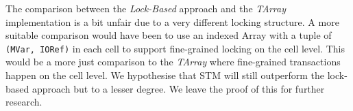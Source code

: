The comparison between the \textit{Lock-Based} approach and the \textit{TArray} implementation is a bit unfair due to a very different locking structure. A more suitable comparison would have been to use an indexed Array with a tuple of \texttt{(MVar, IORef)} in each cell to support fine-grained locking on the cell level. This would be a more just comparison to the \textit{TArray} where fine-grained transactions happen on the cell level. We hypothesise that STM will still outperform the lock-based approach but to a lesser degree. We leave the proof of this for further research.


